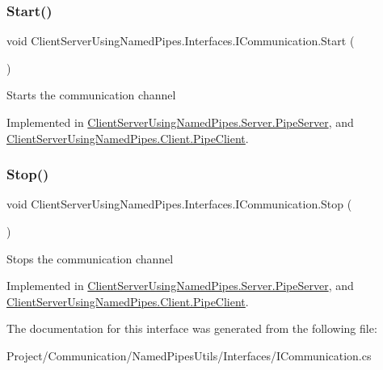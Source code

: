 \subsubsection{\texorpdfstring{Start()}{Start()}}
{\footnotesize\ttfamily void Client\+Server\+Using\+Named\+Pipes.\+Interfaces.\+I\+Communication.\+Start (\begin{DoxyParamCaption}{ }\end{DoxyParamCaption})}



Starts the communication channel 



Implemented in \hyperlink{class_client_server_using_named_pipes_1_1_server_1_1_pipe_server_a91d854612c235fa7da870e6a861f91c5}{Client\+Server\+Using\+Named\+Pipes.\+Server.\+Pipe\+Server}, and \hyperlink{class_client_server_using_named_pipes_1_1_client_1_1_pipe_client_a0bb2855199630657cdf070e3c4275b51}{Client\+Server\+Using\+Named\+Pipes.\+Client.\+Pipe\+Client}.

\mbox{\label{interface_client_server_using_named_pipes_1_1_interfaces_1_1_i_communication_a85ce939996cde20d398e799ca6a900f3}} 
\subsubsection{\texorpdfstring{Stop()}{Stop()}}
{\footnotesize\ttfamily void Client\+Server\+Using\+Named\+Pipes.\+Interfaces.\+I\+Communication.\+Stop (\begin{DoxyParamCaption}{ }\end{DoxyParamCaption})}



Stops the communication channel 



Implemented in \hyperlink{class_client_server_using_named_pipes_1_1_server_1_1_pipe_server_a37eb41a1b69ab108b9eb5745950b3ab9}{Client\+Server\+Using\+Named\+Pipes.\+Server.\+Pipe\+Server}, and \hyperlink{class_client_server_using_named_pipes_1_1_client_1_1_pipe_client_a9d442b0b2a19c3d460185a8bb27e36e9}{Client\+Server\+Using\+Named\+Pipes.\+Client.\+Pipe\+Client}.



The documentation for this interface was generated from the following file\+:\begin{DoxyCompactItemize}
\item 
Project/\+Communication/\+Named\+Pipes\+Utils/\+Interfaces/I\+Communication.\+cs\end{DoxyCompactItemize}
